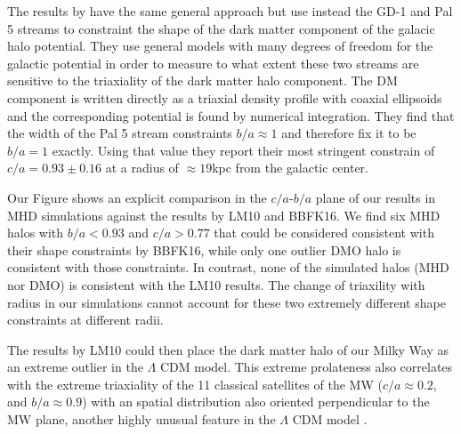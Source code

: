 \documentclass[usenatbib]{mnras}
\begin{document}
The results by \cite{Bovy16} have the same general approach but use
instead the GD-1 \citep{2006ApJ...641L..37G} and Pal 5 \citep{2009AJ....137.3378O}
streams to constraint the shape of the dark matter component of the
galacic halo potential.
They use general models with many degrees of freedom for the galactic
potential in order to measure to what extent these two streams are sensitive
to the triaxiality of the dark matter halo component.
The DM component is written directly as a triaxial density profile
with coaxial ellipsoids and the corresponding potential is found by
numerical integration.
They find that the width of the Pal 5 stream constraints $b/a\approx
1$ and therefore fix it to be $b/a=1$ exactly.
Using that value they report their most stringent constrain of
$c/a=0.93\pm0.16$ at a radius of $\approx 19$kpc from the galactic
center. 

Our Figure \label{fig:observations} shows an explicit comparison in
the $c/a$-$b/a$ plane of our results in MHD simulations against the
results by LM10 and BBFK16.  
We find six MHD halos with $b/a<0.93$ and $c/a>0.77$ that could be
considered consistent with their shape constraints  by BBFK16, while
only one outlier DMO halo is consistent with those constraints.
In contrast, none of the simulated halos (MHD nor DMO) is consistent
with the LM10 results. 
The change of triaxility with radius in our simulations cannot account
for these two extremely different shape constraints at different
radii. 


The results by LM10 could then place the dark matter halo of our Milky
Way as an extreme outlier in the $\Lambda$ CDM model. 
This extreme prolateness also correlates with the extreme
triaxiality of the 11 classical satellites of the MW ($c/a\approx
0.2$, and $b/a\approx0.9$) with an spatial distribution 
also oriented perpendicular to the MW plane, another highly unusual
feature in the $\Lambda$ CDM model \citep{2018MNRAS.478.5533F}.
\end{document}
